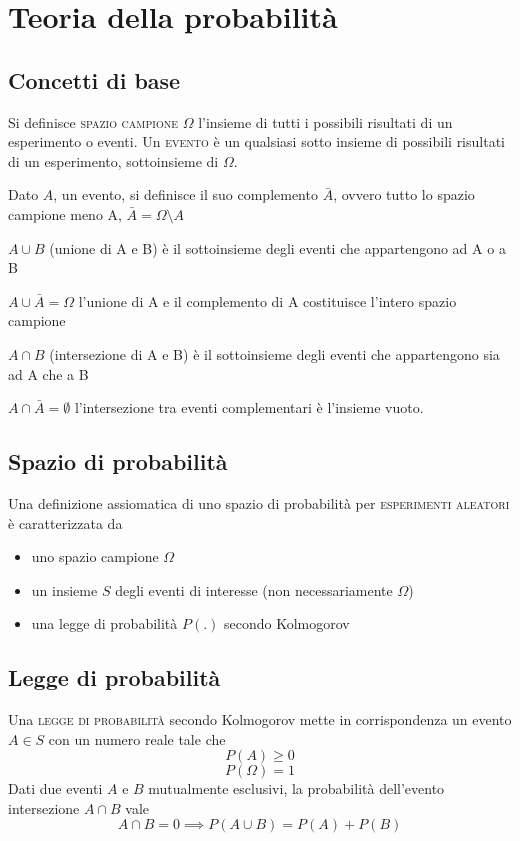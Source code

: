 \chapter{Teoria della probabilità}
\label{ch:teoriasegnali-capitolo4}
\section{Concetti di base}
Si definisce \textsc{spazio campione} $\Omega$ l'insieme di tutti i possibili risultati di un esperimento o eventi. Un \textsc{evento} è un qualsiasi sotto insieme di possibili risultati di un esperimento, sottoinsieme di $\Omega$.

Dato $A$, un evento, si definisce il suo complemento $\bar{A}$, ovvero tutto lo spazio campione meno A, $\bar{A}=\Omega\setminus A$

$A\cup B$ (unione di A e B) è il sottoinsieme degli eventi che appartengono ad A o a B

$A\cup\bar{A}=\Omega$ l'unione di A e il complemento di A costituisce l'intero spazio campione

$A\cap B$ (intersezione di A e B) è il sottoinsieme degli eventi che appartengono sia ad A che a B

$A\cap\bar{A}=\emptyset$ l'intersezione tra eventi complementari è l'insieme vuoto.

\section{Spazio di probabilità}
Una definizione assiomatica di uno spazio di probabilità per \textsc{esperimenti aleatori} è caratterizzata da
\begin{itemize}
	\item uno spazio campione $\Omega$
	\item un insieme $S$ degli eventi di interesse (non necessariamente $\Omega$)
	\item una legge di probabilità $P(.)$ secondo Kolmogorov
\end{itemize}

\section{Legge di probabilità}
Una \textsc{legge di probabilità} secondo Kolmogorov mette in corrispondenza un evento $A\in S$ con un numero reale tale che
\begin{equation}
	P(A)\geq 0
\end{equation}
\begin{equation}
	P(\Omega)=1
\end{equation}
Dati due eventi $A$ e $B$ mutualmente esclusivi, la probabilità dell'evento intersezione $A\cap B$ vale
\begin{equation}
	A\cap B=0\implies P(A\cup B)=P(A)+P(B)
\end{equation}

